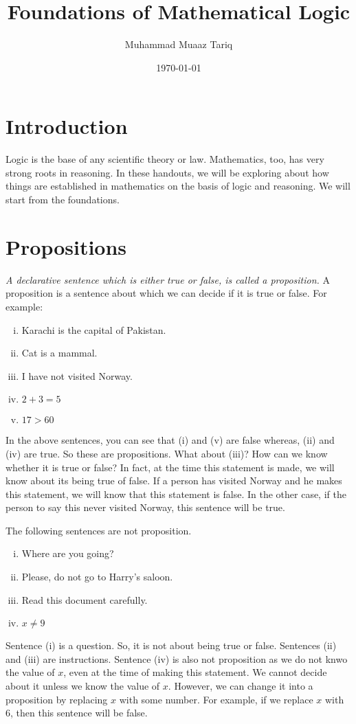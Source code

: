 \documentclass[a4paper]{article}
\title{Foundations of Mathematical Logic}
\author{Muhammad Muaaz Tariq}
\date{\today}
\theoremstyle{definition}
\theoremstyle{definition}
\theoremstyle{definition}
\theoremstyle{definition}
\theoremstyle{definition}
\theoremstyle{definition}
\theoremstyle{definition}
\begin{document}
\maketitle

\section*{Introduction}
Logic is the base of any scientific theory or law. Mathematics, too, has very strong roots in reasoning. In these handouts, we will be exploring about how things are established in mathematics on the basis of logic and reasoning. We will start from the foundations.
 
\section{Propositions}
\textit{A declarative sentence which is either true or false, is called a proposition.} A proposition is a sentence about which we can decide if it is true or false. For example:
\begin{enumerate}[i.]
    \item Karachi is the capital of Pakistan.
    \item Cat is a mammal.
    \item I have not visited Norway.
    \item $2 + 3 = 5$
    \item $ 17 > 60$
\end{enumerate}
In the above sentences, you can see that (i) and (v) are false whereas, (ii) and (iv) are true. So these are propositions. What about (iii)? How can we know whether it is true or false? In fact, at the time this statement is made, we will know about its being true of false. If a person has visited Norway and he makes this statement, we will know that this statement is false. In the other case, if the person to say this never visited Norway, this sentence will be true.


The following sentences are not proposition.
\begin{enumerate}[i.]
    \item Where are you going?
    \item Please, do not go to Harry's saloon.
    \item Read this document carefully.
    \item $x \neq 9$
\end{enumerate}
Sentence (i) is a question. So, it is not about being true or false. Sentences (ii) and (iii) are instructions. Sentence (iv) is also not proposition as we do not knwo the value of $x$, even at the time of making this statement. We cannot decide about it unless we know the value of $x$. However, we can change it into a proposition by replacing $x$ with some number. For example, if we replace $x$ with 6, then this sentence will be false.
\end{document}
